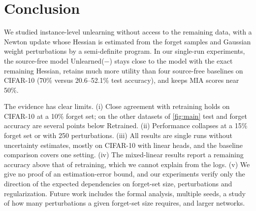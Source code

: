 \documentclass[10pt,twocolumn,letterpaper]{article}
\begin{document}
\section{Conclusion}
\label{sec:conclusion}
We studied instance-level unlearning without access to the remaining data, with a Newton update whose Hessian is estimated from the forget samples and Gaussian weight perturbations by a semi-definite program.
In our single-run experiments, the source-free model Unlearned($-$) stays close to the model with the exact remaining Hessian, retains much more utility than four source-free baselines on CIFAR-10 (70\% versus 20.6--52.1\% test accuracy), and keeps MIA scores near 50\%.

The evidence has clear limits.
(i) Close agreement with retraining holds on CIFAR-10 at a 10\% forget set; on the other datasets of \cref{fig:main} test and forget accuracy are several points below Retrained.
(ii) Performance collapses at a 15\% forget set or with 250 perturbations.
(iii) All results are single runs without uncertainty estimates, mostly on CIFAR-10 with linear heads, and the baseline comparison covers one setting.
(iv) The mixed-linear results report a remaining accuracy above that of retraining, which we cannot explain from the logs.
(v) We give no proof of an estimation-error bound, and our experiments verify only the direction of the expected dependencies on forget-set size, perturbations and regularization.
Future work includes the formal analysis, multiple seeds, a study of how many perturbations a given forget-set size requires, and larger networks.

{
    \small
    
    
}

\end{document}
